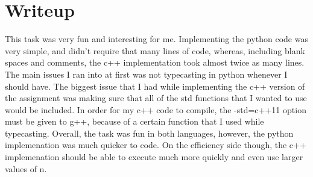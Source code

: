 \documentclass[11pt]{article}
\begin{document}
\section{Writeup}
This task was very fun and interesting for me.  Implementing the python code was very simple, and didn't require that many lines of code, whereas, including blank spaces and comments, the c++ implementation took almost twice as many lines.  The main issues I ran into at first was not typecasting in python whenever I should have. The biggest issue that I had while implementing the c++ version of the assignment was making sure that all of the std functions that I wanted to use would be included. In order for my c++ code to compile, the -std=c++11 option must be given to g++, because of a certain function that I used while typecasting. Overall, the task was fun in both languages, however, the python implemenation was much quicker to code. On the efficiency side though, the c++ implemenation should be able to execute much more quickly and even use larger values of n.
\end{document}
